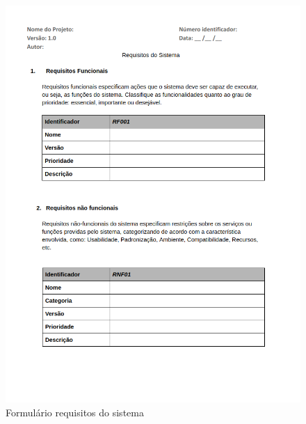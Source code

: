 \documentclass[	DIV=calc,%
							paper=a4,%
							fontsize=12pt,%
							onecolumn]{scrartcl}	 					%
\begin{document}
\begin{figure}
	\centering
	\includegraphics[width=\textwidth]{2.png}
	\caption{Formulário requisitos do sistema}
	\label{Figura 2}
\end{figure}
\end{document}

